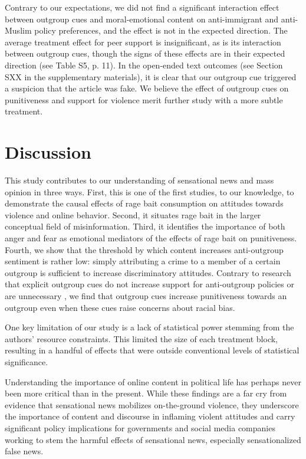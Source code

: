 \documentclass[12pt, letterpaper]{article}
\begin{document}
Contrary to our expectations, we did not find a significant interaction effect between outgroup cues and moral-emotional content on anti-immigrant and anti-Muslim policy preferences, and the effect is not in the expected direction. The average treatment effect for peer support is insignificant, as is its interaction between outgroup cues, though the signs of these effects are in their expected direction (see Table S5, p. 11). In the open-ended text outcomes (see Section SXX in the supplementary materials), it is clear that our outgroup cue triggered a suspicion that the article was fake. We believe the effect of outgroup cues on punitiveness and support for violence merit further study with a more subtle treatment.

\section{Discussion}

This study contributes to our understanding of sensational news and mass opinion in three ways. First, this is one of the first studies, to our knowledge, to demonstrate the causal effects of rage bait consumption on attitudes towards violence and online behavior. Second, it situates rage bait in the larger conceptual field of misinformation. Third, it identifies the importance of both anger and fear as emotional mediators of the effects of rage bait on punitiveness. Fourth, we show that the threshold by which content increases anti-outgroup sentiment is rather low: simply attributing a crime to a member of a certain outgroup is sufficient to increase discriminatory attitudes. Contrary to research that explicit outgroup cues do not increase support for anti-outgroup policies \citep{huber2006race,mendelberg2001race} or are unnecessary \citep{banks2016group}, we find that outgroup cues increase punitiveness towards an outgroup even when these cues raise concerns about racial bias.

One key limitation of our study is a lack of statistical power stemming from the authors' resource constraints. This limited the size of each treatment block, resulting in a handful of effects that were outside conventional levels of statistical significance.

Understanding the importance of online content in political life has perhaps never been more critical than in the present. While these findings are a far cry from evidence that sensational news mobilizes on-the-ground violence, they underscore the importance of content and discourse in inflaming violent attitudes and carry significant policy implications for governments and social media companies working to stem the harmful effects of sensational news, especially sensationalized false news. 
\end{document}
